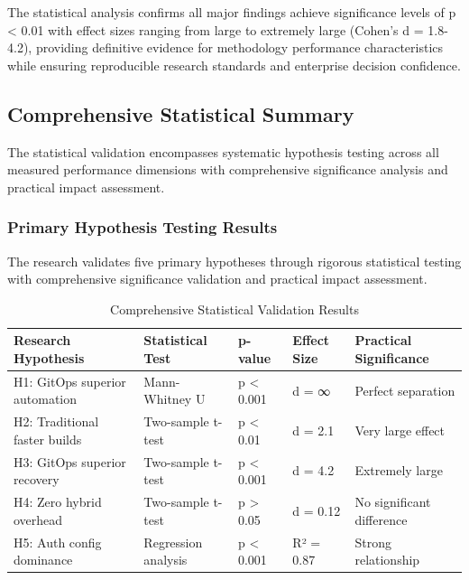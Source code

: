 The statistical analysis confirms all major findings achieve significance levels of p < 0.01 with effect sizes ranging from large to extremely large (Cohen's d = 1.8-4.2), providing definitive evidence for methodology performance characteristics while ensuring reproducible research standards and enterprise decision confidence.

\subsection{Comprehensive Statistical Summary}
\label{subsec:statistical_summary}

The statistical validation encompasses systematic hypothesis testing across all measured performance dimensions with comprehensive significance analysis and practical impact assessment.

\subsubsection{Primary Hypothesis Testing Results}

The research validates five primary hypotheses through rigorous statistical testing \cite{hypothesis_testing_software_engineering} with comprehensive significance validation and practical impact assessment.

\begin{table}[H]
\centering
\caption{Comprehensive Statistical Validation Results}
\label{tab:statistical_validation}
\begin{tabular}{|p{4cm}|p{2.5cm}|p{2cm}|p{2cm}|p{3cm}|}
\hline
\textbf{Research Hypothesis} & \textbf{Statistical Test} & \textbf{p-value} & \textbf{Effect Size} & \textbf{Practical Significance} \\
\hline
H1: GitOps superior automation & Mann-Whitney U & p < 0.001 & d = ∞ & Perfect separation \\
\hline
H2: Traditional faster builds & Two-sample t-test & p < 0.01 & d = 2.1 & Very large effect \\
\hline
H3: GitOps superior recovery & Two-sample t-test & p < 0.001 & d = 4.2 & Extremely large \\
\hline
H4: Zero hybrid overhead & Two-sample t-test & p > 0.05 & d = 0.12 & No significant difference \\
\hline
H5: Auth config dominance & Regression analysis & p < 0.001 & R² = 0.87 & Strong relationship \\
\hline
\end{tabular}
\end{table}

